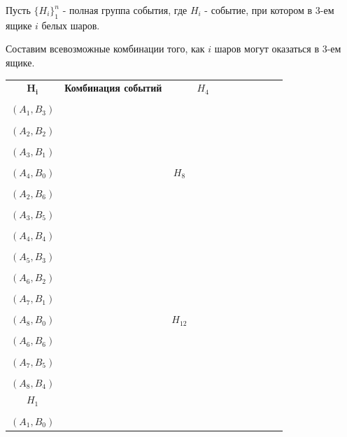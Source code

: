\begin{enumerate}
	Пусть $\{H_i\}_1^n$ - полная группа события, где $H_i$ - событие, при котором в 3-ем ящике $i$ белых шаров. 
	
	Составим всевозможные комбинации того, как $i$ шаров могут оказаться в 3-ем ящике.
	
	\begin{longtable}[c]{|c|c|c|c|c|c|c|c|c|c|c|}
		\cline{1-2} \cline{4-5} \cline{7-8} \cline{10-11}
		$\mathbf{H_i}$ &
		\textbf{Комбинация событий} &
		&
		$H_4$ &
		\begin{tabular}[c]{@{}c@{}}$(A_0, B_4)$\\ \\ $(A_1, B_3)$\\ \\ $(A_2, B_2)$\\ \\ $(A_3, B_1)$\\ \\ $(A_4, B_0)$\end{tabular} &
		&
		$H_8$ &
		\begin{tabular}[c]{@{}c@{}}$(A_1, B_7)$\\ \\ $(A_2, B_6)$\\ \\ $(A_3, B_5)$\\ \\ $(A_4, B_4)$\\ \\ $(A_5, B_3)$\\ \\ $(A_6, B_2)$\\ \\ $(A_7, B_1)$\\ \\ $(A_8, B_0)$\end{tabular} &
		&
		$H_{12}$ &
		\begin{tabular}[c]{@{}c@{}}$(A_5, B_7)$\\ \\ $(A_6, B_6)$\\ \\ $(A_7, B_5)$\\ \\ $(A_8, B_4)$\end{tabular} \\ \cline{1-2} \cline{4-5} \cline{7-8} \cline{10-11} 
		\endfirsthead
		\endhead
		$H_1$ &
		\begin{tabular}[c]{@{}c@{}}$(A_0, B_1)$\\ \\ $(A_1, B_0)$\end{tabular} &

\end{longtable}
\end{enumerate}
